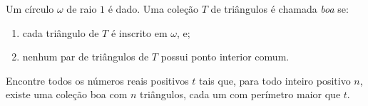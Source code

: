 Um círculo $\omega$ de raio $1$ é dado. Uma coleção $T$ de triângulos é chamada \emph{boa} se:
\begin{enumerate}[label = (\textit{\roman*})]
	\item cada triângulo de $T$ é inscrito em $\omega$, e;
	\item nenhum par de triângulos de $T$ possui ponto interior comum.
\end{enumerate}

Encontre todos os números reais positivos $t$ tais que, para todo inteiro positivo $n$, existe uma coleção boa com $n$ triângulos, cada um com perímetro maior que $t$.
